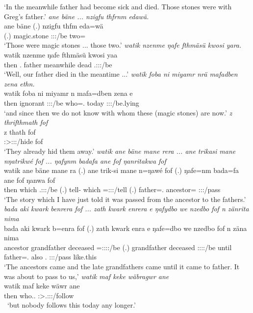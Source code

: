 \begin{exe}
	\trans `In the meanwhile father had become sick and died. Those stones were with Greg's father.'
	\emph{ane bäne ... nzigfu thfrnm edawä.}\\
	\gll ane bäne (.) nzigfu thfm eda=wä\\ 
	\Dem{} \Recog{} (.) magic.stone \Stdu:\Sbj:\Pst:\Dur/be two=\Emph{}\\
	\trans `Those were magic stones ... those two.'
	\emph{watik nzenme ŋafe fthmäsü kwosi yara.}\\
	\gll watik nzenme ŋafe fthmäsü kwosi yaa\\ 
	then \Fnsg.\Poss{} father meanwhile dead \Tsg.\Masc:\Sbj:\Pst:\Ipfv/be\\
	\trans `Well, our father died in the meantime ...'
	\emph{watik foba ni miyamr nrä mafadben zena ethn.}\\
	\gll watik foba ni miyamr n mafa=dben zena e\\ 
	then \Dist{} \Fnsg{} ignorant \Fpl:\Sbj:\Nonpast:\Ipfv/be who=\Loc.\Sg{} today \Stpl:\Sbj:\Nonpast:\Ipfv/be.lying\\
	\trans `and since then we do not know with whom these (magic stones) are now.'
	\emph{z thrifthmath fof}\\
	\gll z thath fof\\ 
	\Iam{} \Stpl:\Sbj>\Stdu:\Obj:\Pst:\Pfv/hide fof\\
	\trans `They already hid them away.'
	\emph{watik ane bäne mane rera ... ane trikasi mane nŋatrikwé fof ... ŋafynm badafa ane fof ŋanritakwa fof}\\
	\gll watik ane bäne mane ra (.) ane trik-si mane n=ŋawé fof (.) ŋafe=nm bada=fa ane fof ŋanwa fof\\ 
	then \Dem{} \Recog{} which \Tsg.\F:\Sbj:\Pst:\Ipfv/be (.) \Dem{} tell-\Nmlz{} which \Immpst=\Fsg:\Sbj:\Nonpast:\Ipfv/tell \Emph{} (.) father=\Dat.\Nsg{} ancestor=\Abl{} \Dem{} \Emph{} \Sg:\Sbj:\Pst:\Ipfv/pass \Emph{}\\
	\trans `The story which I have just told it was passed from the ancestor to the fathers.'
	\emph{bada aki kwark benrera fof ... zath kwark enrera e ŋafydbo we nzedbo fof n zänrita nima}\\
	\gll bada aki kwark b=enra fof (.) zath kwark enra e ŋafe=dbo we nzedbo fof n zäna nima\\ 
	ancestor grandfather deceased \Med=\Stpl:\Sbj:\Pst:\Ipfv:\Venit/be \Emph{} (.) grandfather deceased \Stpl:\Sbj:\Pst:\Ipfv:\Venit/be until father=\All.\Sg{} also \Fnsg.\All{} \Emph{} \Iam{} \Sg:\Sbj:\Pst:\Pfv/pass like.this\\
	\trans `The ancestors came and the late grandfathers came until it came to father. It was about to pass to us,'
	\emph{watik maf keke wäbragwr ane}\\
	\gll watik maf keke wäwr ane\\ 
	then who.\Erg.\Sg{} \Neg{} \Stsg:\Sbj>\Tsg.\F:\Obj:\Nonpast:\Ipfv/follow \Dem{}\\\
	\trans `but nobody follows this today any longer.'
\end{exe}%